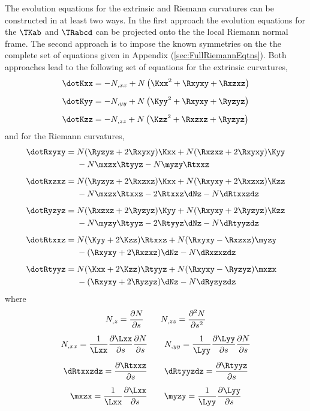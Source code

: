 \documentclass[a4paper,12pt]{article}
\numberwithin{equation}{section}
\begin{document}
The evolution equations for the extrinsic and Riemann curvatures can be constructed in at
least two ways. In the first approach the evolution equations for the $\TKab$ and $\TRabcd$
can be projected onto the the local Riemann normal frame. The second approach is to impose
the known symmetries on the the complete set of equations given in Appendix
(\ref{sec:FullRiemannEqtns}). Both approaches lead to the following set of equations
for the extrinsic curvatures,
\begin{align}
   \label{eqn:DotGowdyKxx}\dotKxx &= -N_{,xx} + N\left(\Kxx^2 + \Rxyxy +\Rxzxz\right)\\[5pt]
   \label{eqn:DotGowdyKyy}\dotKyy &= -N_{,yy} + N\left(\Kyy^2 + \Rxyxy +\Ryzyz\right)\\[5pt]
   \label{eqn:DotGowdyKzz}\dotKzz &= -N_{,zz} + N\left(\Kzz^2 + \Rxzxz +\Ryzyz\right)
\end{align}
and for the Riemann curvatures,
\begin{align}
%
%
   \label{eqn:DotGowdyRxyxy}
   \dotRxyxy ={}&
        N(\Ryzyz+2\Rxyxy) \Kxx
       +N(\Rxzxz+2\Rxyxy) \Kyy
      \notag\\
      &-N\mxzx \Rtyyz
       -N\myzy \Rtxxz
      \\[5pt]
%
   \label{eqn:DotGowdyRxzxz}
   \dotRxzxz ={}&
        N(\Ryzyz+2\Rxzxz) \Kxx
       +N(\Rxyxy+2\Rxzxz) \Kzz
      \notag\\
      &-N\mxzx \Rtxxz
      -2\Rtxxz \dNz
      -N\dRtxxzdz
      \\[5pt]
%
   \label{eqn:DotGowdyRyzyz}
   \dotRyzyz ={}&
        N(\Rxzxz+2\Ryzyz) \Kyy
       +N(\Rxyxy+2\Ryzyz) \Kzz
      \notag\\
      &-N\myzy \Rtyyz
       -2\Rtyyz \dNz
       -N\dRtyyzdz
      \\[5pt]
%
   \label{eqn:DotGowdyRtxxz}
   \dotRtxxz ={}&
        N(\Kyy+2\Kzz) \Rtxxz
       +N(\Rxyxy-\Rxzxz) \myzy
      \notag\\
      &-(\Rxyxy+2\Rxzxz) \dNz
       -N\dRxzxzdz
      \\[5pt]
%
   \label{eqn:DotGowdyRtyyz}
   \dotRtyyz ={}&
        N(\Kxx+2\Kzz)\Rtyyz
       +N(\Rxyxy-\Ryzyz) \mxzx
      \notag\\
      &-(\Rxyxy+2\Ryzyz) \dNz
       -N\dRyzyzdz
\end{align}
where
\begin{gather}
   N_{,z}  = \frac{\partial N}{\partial{ s}}\qquad
   N_{,zz} = \frac{\partial^2 N}{\partial{ s}^2}\\[5pt]
   N_{,xx} = \frac{1}{\Lxx}\frac{\partial\Lxx}{\partial s}
                           \frac{\partial N}{\partial{ s}}\qquad
   N_{,yy} = \frac{1}{\Lyy}\frac{\partial\Lyy}{\partial s}
                           \frac{\partial N}{\partial{ s}}\\[5pt]
   \label{eqn:GowdyDRabcd}
   \dRtxxzdz = \frac{\partial \Rtxxz}{\partial{ s}}\qquad
   \dRtyyzdz = \frac{\partial \Rtyyz}{\partial{ s}}\\[5pt]
   \label{eqn:GowdyMabc}
   \mxzx =\frac{1}{\Lxx}\frac{\partial\Lxx}{\partial s}\qquad
   \myzy =\frac{1}{\Lyy}\frac{\partial\Lyy}{\partial s}
\end{gather}
\end{document}
